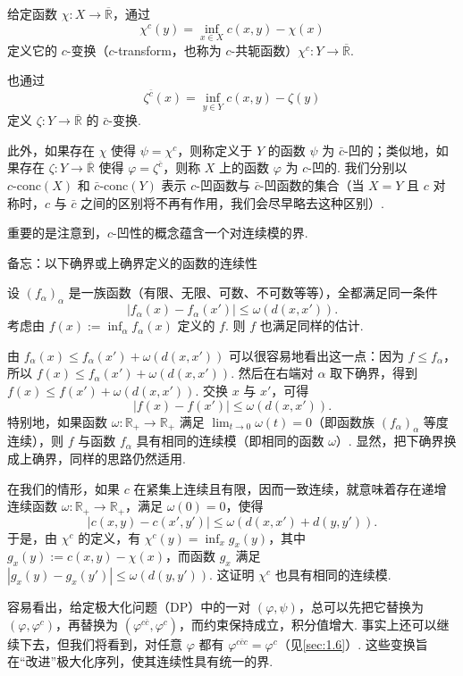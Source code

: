 \begin{definition}\label{obj:1.10}
给定函数 $\chi:X\to\overline{\mathbb R}$，通过
\[
\chi^c(y)=\inf_{x\in X}c(x,y)-\chi(x)
\]
定义它的 $c$-变换（$c$-transform，也称为 $c$-共轭函数）$\chi^c:Y\to\overline{\mathbb R}$.

也通过
\[
\zeta^{\bar c}(x)=\inf_{y\in Y}c(x,y)-\zeta(y)
\]
定义 $\zeta:Y\to\overline{\mathbb R}$ 的 $\bar c$-变换.

此外，如果存在 $\chi$ 使得 $\psi=\chi^c$，则称定义于 $Y$ 的函数 $\psi$ 为 $\bar c$-凹的；类似地，如果存在 $\zeta:Y\to\overline{\mathbb R}$ 使得 $\varphi=\zeta^{\bar c}$，则称 $X$ 上的函数 $\varphi$ 为 $c$-凹的. 我们分别以 $c\text{-}\mathrm{conc}(X)$ 和 $\bar c\text{-}\mathrm{conc}(Y)$ 表示 $c$-凹函数与 $\bar c$-凹函数的集合（当 $X=Y$ 且 $c$ 对称时，$c$ 与 $\bar c$ 之间的区别将不再有作用，我们会尽早略去这种区别）.
\end{definition}

重要的是注意到，$c$-凹性的概念蕴含一个对连续模的界.

\begin{sourcebox}{备忘：以下确界或上确界定义的函数的连续性}\label{box:1.8}
\begin{proposition*}
设 $(f_\alpha)_\alpha$ 是一族函数（有限、无限、可数、不可数等等），全都满足同一条件
\[
|f_\alpha(x)-f_\alpha(x')|\le\omega(d(x,x')).
\]
考虑由 $f(x):=\inf_\alpha f_\alpha(x)$ 定义的 $f$. 则 $f$ 也满足同样的估计.
\end{proposition*}

由 $f_\alpha(x)\le f_\alpha(x')+\omega(d(x,x'))$ 可以很容易地看出这一点：因为 $f\le f_\alpha$，所以 $f(x)\le f_\alpha(x')+\omega(d(x,x'))$. 然后在右端对 $\alpha$ 取下确界，得到 $f(x)\le f(x')+\omega(d(x,x'))$. 交换 $x$ 与 $x'$，可得
\[
|f(x)-f(x')|\le\omega(d(x,x')).
\]
特别地，如果函数 $\omega:\mathbb R_+\to\mathbb R_+$ 满足 $\lim_{t\to0}\omega(t)=0$（即函数族 $(f_\alpha)_\alpha$ 等度连续），则 $f$ 与函数 $f_\alpha$ 具有相同的连续模（即相同的函数 $\omega$）. 显然，把下确界换成上确界，同样的思路仍然适用.
\end{sourcebox}

在我们的情形，如果 $c$ 在紧集上连续且有限，因而一致连续，就意味着存在递增连续函数 $\omega:\mathbb R_+\to\mathbb R_+$，满足 $\omega(0)=0$，使得
\[
|c(x,y)-c(x',y')|\le\omega(d(x,x')+d(y,y')).
\]
于是，由 $\chi^c$ 的定义，有 $\chi^c(y)=\inf_x g_x(y)$，其中 $g_x(y):=c(x,y)-\chi(x)$，而函数 $g_x$ 满足 $|g_x(y)-g_x(y')|\le\omega(d(y,y'))$. 这证明 $\chi^c$ 也具有相同的连续模.

容易看出，给定极大化问题（DP）中的一对 $(\varphi,\psi)$，总可以先把它替换为 $(\varphi,\varphi^c)$，再替换为 $(\varphi^{c\bar c},\varphi^c)$，而约束保持成立，积分值增大. 事实上还可以继续下去，但我们将看到，对任意 $\varphi$ 都有 $\varphi^{c\bar cc}=\varphi^c$（见\autoref{sec:1.6}）. 这些变换旨在“改进”极大化序列，使其连续性具有统一的界.

